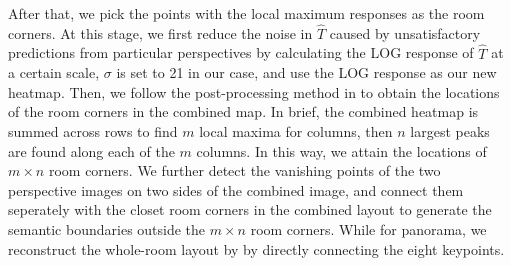 %
After that, we pick the points with the local maximum responses as the room corners. 
At this stage, we first reduce the noise in $\hat{T}$ caused by unsatisfactory predictions from particular perspectives by calculating the LOG response of $\hat{T}$ at a certain scale, $\sigma$ is set to 21 in our case, and use the LOG response as our new heatmap.
%
Then, we follow the post-processing method in \cite{zou2018layoutnet} to obtain the locations of the room corners in the combined map. In brief, the combined heatmap is summed across rows to find $m$ local maxima for columns, then $n$ largest peaks are found along each of the $m$ columns. In this way, we attain the locations of $m \times n$ room corners. We further detect the vanishing points of the two perspective images on two sides of the combined image, and connect them seperately with the closet room corners in the combined layout to generate the semantic boundaries outside the $m \times n$ room corners. While for panorama, we reconstruct the whole-room layout by by directly connecting the eight keypoints.
%


